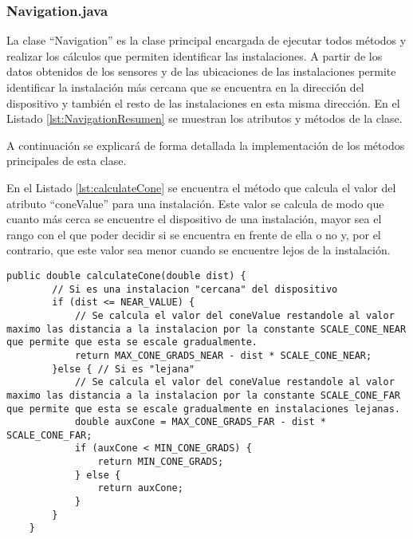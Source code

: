 \subsubsection{Navigation.java}

La clase ``Navigation'' es la clase principal encargada de  ejecutar todos métodos y realizar  los cálculos que permiten identificar las instalaciones. A partir de los datos obtenidos de los sensores y de las ubicaciones de las instalaciones permite identificar la instalación más cercana que se encuentra en la dirección del dispositivo y también el resto de las instalaciones en esta misma dirección. En el Listado \ref{lst:NavigationResumen} se muestran los atributos y métodos de la clase.


A continuación se explicará de forma detallada la implementación de los métodos principales de esta clase.

En el Listado \ref{lst:calculateCone} se encuentra el método que calcula el valor del atributo ``coneValue'' para una instalación. 
Este valor se calcula de modo que cuanto más cerca se encuentre el dispositivo de una instalación, mayor sea el rango con el que poder decidir si se encuentra en frente de ella o no y, por el contrario, que este valor sea menor cuando se encuentre lejos de la instalación.

\bigskip
\bigskip
\bigskip



\begin{lstlisting}[caption={Código para calcular el \textit{coneValue} de identificación de cada instalación.}, label={lst:calculateCone}]
    public double calculateCone(double dist) {
        // Si es una instalacion "cercana" del dispositivo
        if (dist <= NEAR_VALUE) {
            // Se calcula el valor del coneValue restandole al valor maximo las distancia a la instalacion por la constante SCALE_CONE_NEAR que permite que esta se escale gradualmente.
            return MAX_CONE_GRADS_NEAR - dist * SCALE_CONE_NEAR;
        }else { // Si es "lejana"
            // Se calcula el valor del coneValue restandole al valor maximo las distancia a la instalacion por la constante SCALE_CONE_FAR que permite que esta se escale gradualmente en instalaciones lejanas.
            double auxCone = MAX_CONE_GRADS_FAR - dist * SCALE_CONE_FAR;
            if (auxCone < MIN_CONE_GRADS) {
                return MIN_CONE_GRADS;
            } else {
                return auxCone;
            }
        }
    }
\end{lstlisting}


